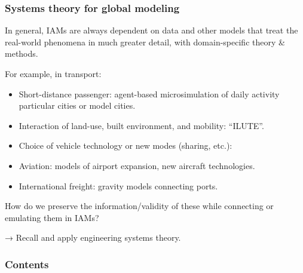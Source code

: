 \documentclass[12pt,aspectratio=169]{beamer}
\begin{document}
\begin{frame}[allowframebreaks]
  \frametitle{Systems theory for global modeling}

  In general, IAMs are always dependent on data and other models that treat the real-world phenomena in much greater detail, with domain-specific theory \& methods.

  \bigskip
  For example, in transport:
  \begin{itemize}
    \item Short-distance passenger: agent-based microsimulation of daily activity particular cities or model cities.
    \item Interaction of land-use, built environment, and mobility: “ILUTE”.
    \item Choice of vehicle technology or new modes (sharing, etc.):
    \item Aviation: models of airport expansion, new aircraft technologies.
    \item International freight: gravity models connecting ports.
  \end{itemize}

  \bigskip
  How do we preserve the information/validity of these while connecting or emulating them in IAMs?

  \bigskip
  → Recall and apply engineering systems theory.
\end{frame}



\begin{frame}[plain]

  \centering \Huge {}

\end{frame}

\begin{frame}
  \frametitle{Contents}
  \tableofcontents
\end{frame}


\end{document}
